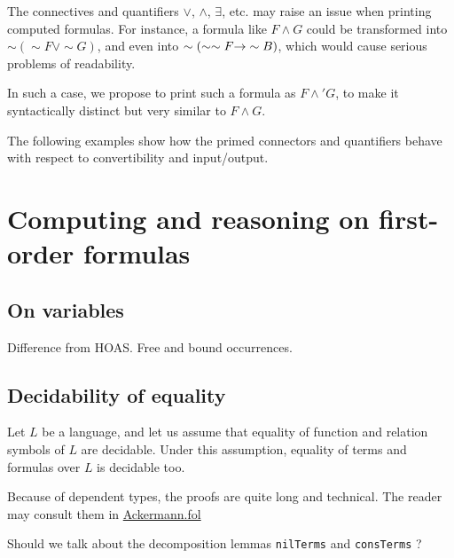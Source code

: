 The connectives and quantifiers $\vee$, $\wedge$, $\exists$, etc. may raise an issue when printing computed formulas.
For instance, a formula like $F \wedge G$ could be transformed into $\sim(\sim F \vee \sim G)$,  and even
into $\sim(\sim\sim F \mbox{$\rightarrow$} \sim B)$, which would 
cause serious problems of readability.

In such a case, we propose to print such a formula as $F \wedge' G$, to make it syntactically distinct but very similar to $F \wedge G$.


The following examples show how the primed connectors 
and quantifiers behave with respect to convertibility and 
input/output.










\section{Computing and reasoning on first-order formulas}

\subsection{On variables}

\begin{todo}
  Difference from HOAS. Free and bound occurrences.
\end{todo}

\subsection{Decidability of equality}
Let $L$ be a language, and let us assume that equality 
of function and relation symbols of $L$ are decidable.
Under this assumption, equality of terms and formulas over $L$ is decidable too.

Because of dependent types, the proofs are quite long and technical. The reader may consult them in \href{../theories/html/hydras.Ackermann.fol.html}{Ackermann.fol}

\begin{todo}
  Should we talk about the decomposition lemmas
\texttt{nilTerms} and \texttt{consTerms} ?
\end{todo}


